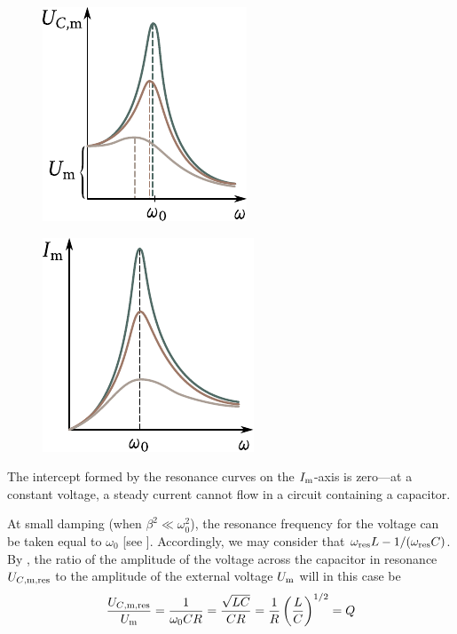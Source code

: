 \begin{figure}[t]
	\begin{minipage}[t]{0.48\linewidth}
		\begin{center}
			\includegraphics[scale=1]{figures/ch_13/fig_13_7.pdf}
			\caption[]{}
			\label{fig:13_7}
		\end{center}
	\end{minipage}
	\hfill{ }%
	\begin{minipage}[t]{0.48\linewidth}
		\begin{center}
			\includegraphics[scale=1]{figures/ch_13/fig_13_8.pdf}
			\caption[]{}
			\label{fig:13_8}
		\end{center}
	\end{minipage}
\vspace{-0.4cm}
\end{figure}

The intercept formed by the resonance curves on the $I_{\text{m}}$-axis is zero---at a constant voltage, a steady current cannot flow in a circuit containing a capacitor.

At small damping (when $\beta^2\ll\omega_0^2$), the resonance frequency for the voltage can be taken equal to $\omega_0$ [see ].
Accordingly, we may consider that $\omega_{\text{res}}L-1/(\omega_{\text{res}}C)$.
By , the ratio of the amplitude of the voltage across the capacitor in resonance $U_{\text{$C$,m,res}}$ to the amplitude of the external voltage $U_{\text{m}}$ will in this case be
\begin{equation}\label{eq:13_43}
    \frac{U_{\text{$C$,m,res}}}{U_{\text{m}}} = \frac{1}{\omega_0 CR} = \frac{\sqrt{LC}}{CR} = \frac{1}{R} \left(\frac{L}{C}\right)^{1/2} = Q
\end{equation}

